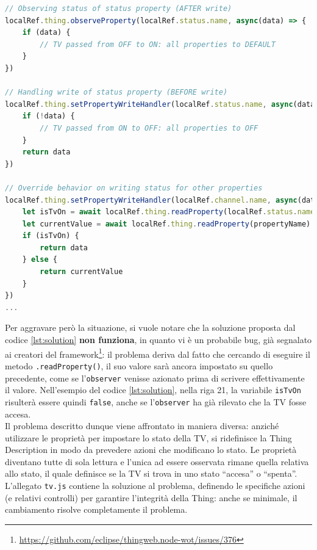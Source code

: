 \documentclass[12pt,a4paper,openright,oneside]{report}
\newcommand{\quotes}[1]{``#1''}
\begin{document}
\begin{lstlisting}[language=JavaScript,caption={Solzuione proposta per la dipendenza tra proprietà della Thing},label=lst:solution]
// Observing status of status property (AFTER write)
localRef.thing.observeProperty(localRef.status.name, async(data) => {
	if (data) {
		// TV passed from OFF to ON: all properties to DEFAULT
	}
})

// Handling write of status property (BEFORE write)
localRef.thing.setPropertyWriteHandler(localRef.status.name, async(data) => {
	if (!data) {
		// TV passed from ON to OFF: all properties to OFF
	}
	return data
})

// Override behavior on writing status for other properties
localRef.thing.setPropertyWriteHandler(localRef.channel.name, async(data) => {
	let isTvOn = await localRef.thing.readProperty(localRef.status.name)
	let currentValue = await localRef.thing.readProperty(propertyName)
	if (isTvOn) {
		return data
	} else {
		return currentValue
	}
})
...
\end{lstlisting}

Per aggravare però la situazione, si vuole notare che la soluzione proposta dal codice \ref{lst:solution} \textbf{non funziona}, in quanto vi è un probabile bug, già segnalato ai creatori del framework\footnote{\url{https://github.com/eclipse/thingweb.node-wot/issues/376}}: il problema deriva dal fatto che cercando di eseguire il metodo \texttt{.readProperty()}, il suo valore sarà ancora impostato su quello precedente, come se l'\texttt{observer} venisse azionato prima di scrivere effettivamente il valore. Nell'esempio del codice \ref{lst:solution}, nella riga 21, la variabile \texttt{isTvOn} risulterà essere quindi \texttt{false}, anche se l'\texttt{observer} ha già rilevato che la TV fosse accesa.\\

Il problema descritto dunque viene affrontato in maniera diversa: anziché utilizzare le proprietà per impostare lo stato della TV, si ridefinisce la Thing Description in modo da prevedere azioni che modificano lo stato. Le proprietà diventano tutte di sola lettura e l'unica ad essere osservata rimane quella relativa allo stato, il quale definisce se la TV si trova in uno stato \quotes{accesa} o \quotes{spenta}. L'allegato \texttt{tv.js} contiene la soluzione  al problema, definendo le specifiche azioni (e relativi controlli) per garantire l'integrità della Thing: anche se minimale, il cambiamento risolve completamente il problema.\\
\end{document}
